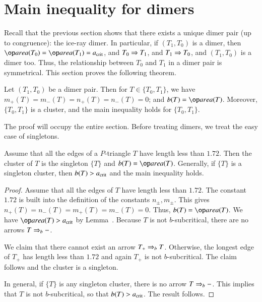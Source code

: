 \section{Main inequality for dimers}

Recall that the previous section shows that there exists a unique
dimer pair (up to congruence): the ice-ray dimer.  In particular, if
$(T_1,T_0)$ is a dimer, then $\area(T_0)=\area(T_1)=\acrit$, and
$T_0\Rightarrow T_1$, and $T_1\Rightarrow T_0$, and $(T_1,T_0)$ is a dimer too.  Thus,
the relationship between $T_0$ and $T_1$ in a dimer pair is
symmetrical.  This section proves the following theorem.

\begin{theorem} 
  Let $(T_1,T_0)$ be a dimer pair.  Then for $T\in\{T_0,T_1\}$, we have
  $m_+(T)=m_-(T) = n_+(T)=n_-(T) = 0$; and $b(T) = \area(T)$.
  Moreover, $\{T_0,T_1\}$ is a cluster, and the main inequality holds
  for $\{T_0,T_1\}$.
\end{theorem}

The proof will occupy the entire section.  Before treating dimers, we
treat the easy case of singletons.

\begin{lemma}  
  Assume that all the edges of a $P$-triangle $T$ have length less
  than $1.72$.  Then the cluster of $T$ is the singleton $\{T\}$ and
  $b(T) =\area(T)$.  Generally, if $\{T\}$ is a singleton
  cluster, then $b(T) > a_\text{crit}$ and the main inequality holds.
\end{lemma}

\begin{proof} 
  Assume that all the edges of $T$ have length less than $1.72$.  The
  constant $1.72$ is built into the definition of the constants
  $n_\pm,m_\pm$. This gives $n_+(T)=n_-(T) = m_+(T)=m_-(T)=0$.  Thus,
  $b(T)=\area(T)$.  We have $\area(T) > \acrit$ by
  Lemma~.  Because $T$ is not $b$-subcritical, there are
  no arrows $T\Rightarrow_{b} -$.

  We claim that there cannot exist an arrow $T_+\Rightarrow_{b} T$.  Otherwise,
  the longest edge of $T_+$ has length less than $1.72$ and again
  $T_+$ is not $b$-subcritical.  The claim follows and the cluster is
  a singleton.

  In general, if $\{T\}$ is any singleton cluster, there is no arrow
  $T\Rightarrow_{b} -$.  This implies that $T$ is not $b$-subcritical, so that
  $b(T) > a_\text{crit}$.  The result follows.
\end{proof}

